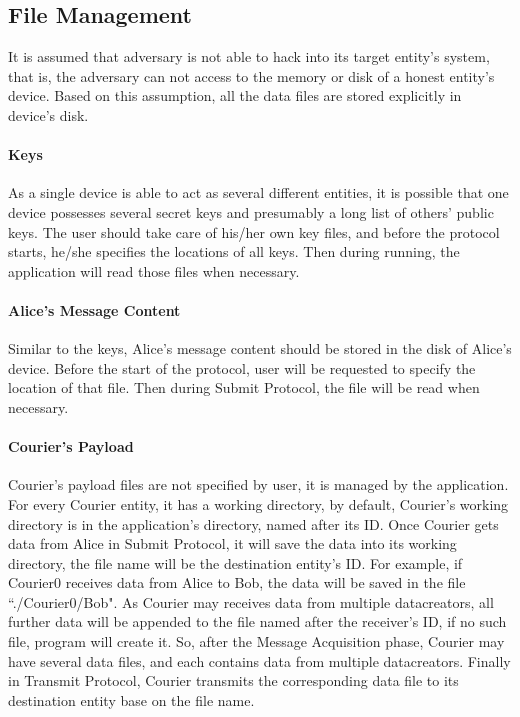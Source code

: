 \subsection{File Management}
It is assumed that adversary is not able to hack into its target entity's system, that is, the adversary can not access to the memory or disk of a honest entity's device. Based on this assumption, all the data files are stored explicitly in device's disk.
\paragraph{Keys}
As a single device is able to act as several different entities, it is possible that one device possesses several secret keys and presumably a long list of others' public keys. The user should take care of his/her own key files, and before the protocol starts, he/she specifies the locations of all keys. Then during running, the application will read those files when necessary.
\paragraph{Alice's Message Content}
Similar to the keys, Alice's message content should be stored in the disk of Alice's device. Before the start of the protocol, user will be requested to specify the location of that file. Then during Submit Protocol, the file will be read when necessary.
\paragraph{Courier's Payload}
Courier's payload files are not specified by user, it is managed by the application. For every Courier entity, it has a working directory, by default, Courier's working directory is in the application's directory, named after its ID. Once Courier gets data from Alice in Submit Protocol, it will save the data into its working directory, the file name will be the destination entity's ID. For example, if Courier0 receives data from Alice to Bob, the data will be saved in the file ``./Courier0/Bob". As Courier may receives data from multiple datacreators, all further data will be appended to the file named after the receiver's ID, if no such file, program will create it. So, after the Message Acquisition phase, Courier may have several data files, and each contains data from multiple datacreators. Finally in Transmit Protocol, Courier transmits the corresponding data file to its destination entity base on the file name.

